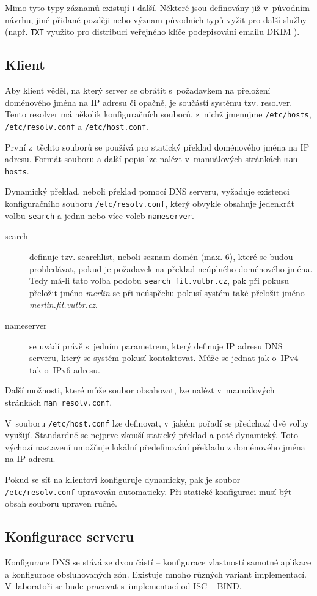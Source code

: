 Mimo tyto typy záznamů existují i další. Některé jsou definovány již v~původním návrhu, jiné přidané později nebo význam původních typů vyžit pro další služby (např. {\tt TXT} využito pro distribuci veřejného klíče podepisování emailu DKIM \cite{rfc4871}).

\subsection{Klient}
Aby klient věděl, na který server se obrátit s~požadavkem na přeložení doménového jména na IP adresu či opačně, je součástí systému tzv. resolver. Tento resolver má několik konfiguračních souborů, z~nichž jmenujme {\tt /etc/hosts}, {\tt /etc/resolv.conf} a {\tt /etc/host.conf}.

První z~těchto souborů se používá pro statický překlad doménového jména na IP adresu. Formát souboru a další popis lze nalézt v~manuálových stránkách {\tt man hosts}.

Dynamický překlad, neboli překlad pomocí DNS serveru, vyžaduje existenci konfiguračního souboru {\tt /etc/resolv.conf}, který obvykle obsahuje jedenkrát volbu {\tt search} a jednu nebo více voleb {\tt nameserver}.
\begin{description}
  \item[search] definuje tzv. searchlist, neboli seznam domén (max. 6), které se budou prohledávat, pokud je požadavek na překlad neúplného doménového jména. Tedy má-li tato volba podobu {\tt search fit.vutbr.cz}, pak při pokusu přeložit jméno {\em merlin} se při neúspěchu pokusí systém také přeložit jméno {\em merlin.fit.vutbr.cz}.
  \item[nameserver] se uvádí právě s~jedním parametrem, který definuje IP adresu DNS serveru, který se systém pokusí kontaktovat. Může se jednat jak o~IPv4 tak o~IPv6 adresu.
\end{description}
Další možnosti, které může soubor obsahovat, lze nalézt v~manuálových stránkách {\tt man resolv.conf}.

V~souboru {\tt /etc/host.conf} lze definovat, v~jakém pořadí se předchozí dvě volby využijí. Standardně se nejprve zkouší statický překlad a poté dynamický. Toto výchozí nastavení umožňuje lokální předefinování překladu z doménového jména na IP adresu.

Pokud se síť na klientovi konfiguruje dynamicky, pak je soubor {\tt /etc/resolv.conf} upravován automaticky. Při statické konfiguraci musí být obsah souboru upraven ručně.

\subsection{Konfigurace serveru}
Konfigurace DNS se stává ze dvou částí -- konfigurace vlastností samotné aplikace a konfigurace obsluhovaných zón. Existuje mnoho různých variant implementací. V~laboratoři se bude pracovat s~implementací od ISC -- BIND.

